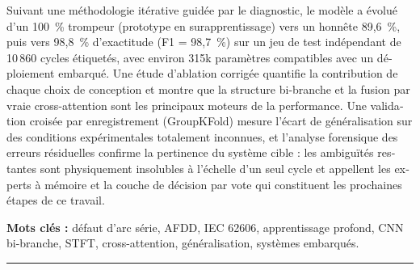 \begin{otherlanguage}{french}
\medskip

\noindent Suivant une méthodologie itérative guidée par le diagnostic, le modèle a évolué d'un 100~\% trompeur (prototype en surapprentissage) vers un honnête 89,6~\%, puis vers 98,8~\% d'exactitude (F1 = 98,7~\%) sur un jeu de test indépendant de 10\,860 cycles étiquetés, avec environ 315k paramètres compatibles avec un déploiement embarqué. Une étude d'ablation corrigée quantifie la contribution de chaque choix de conception et montre que la structure bi-branche et la fusion par vraie cross-attention sont les principaux moteurs de la performance. Une validation croisée par enregistrement (GroupKFold) mesure l'écart de généralisation sur des conditions expérimentales totalement inconnues, et l'analyse forensique des erreurs résiduelles confirme la pertinence du système cible : les ambiguïtés restantes sont physiquement insolubles à l'échelle d'un seul cycle et appellent les experts à mémoire et la couche de décision par vote qui constituent les prochaines étapes de ce travail.

\vspace{0.5cm}

\noindent\textbf{Mots clés :} défaut d'arc série, AFDD, IEC 62606, apprentissage profond, CNN bi-branche, STFT, cross-attention, généralisation, systèmes embarqués.

\vspace{0.4cm}
\noindent\rule{\linewidth}{1pt}

\end{otherlanguage}
